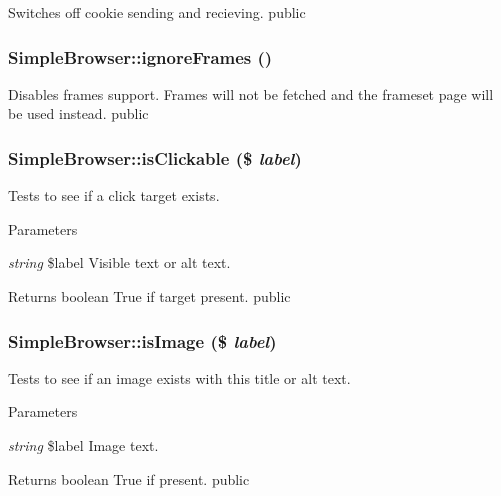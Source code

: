 \label{class_simple_browser_a116178a0d8efe15140f1fdfd53cd8d3c}
Switches off cookie sending and recieving.  public \hypertarget{class_simple_browser_aa2c35905e26fa5d489c9a9d7640080ee}{
\subsubsection[{ignoreFrames}]{\setlength{\rightskip}{0pt plus 5cm}SimpleBrowser::ignoreFrames ()}}
\label{class_simple_browser_aa2c35905e26fa5d489c9a9d7640080ee}
Disables frames support. Frames will not be fetched and the frameset page will be used instead.  public \hypertarget{class_simple_browser_adeb08f275213540419d48f9cad4aeda7}{
\subsubsection[{isClickable}]{\setlength{\rightskip}{0pt plus 5cm}SimpleBrowser::isClickable (\$ {\em label})}}
\label{class_simple_browser_adeb08f275213540419d48f9cad4aeda7}
Tests to see if a click target exists. 
\begin{DoxyParams}{Parameters}
\item[{\em string}]\$label Visible text or alt text. \end{DoxyParams}
\begin{DoxyReturn}{Returns}
boolean True if target present.  public 
\end{DoxyReturn}
\hypertarget{class_simple_browser_a38d002eebc7a6a822ee26e0fb9b6e1cd}{
\subsubsection[{isImage}]{\setlength{\rightskip}{0pt plus 5cm}SimpleBrowser::isImage (\$ {\em label})}}
\label{class_simple_browser_a38d002eebc7a6a822ee26e0fb9b6e1cd}
Tests to see if an image exists with this title or alt text. 
\begin{DoxyParams}{Parameters}
\item[{\em string}]\$label Image text. \end{DoxyParams}
\begin{DoxyReturn}{Returns}
boolean True if present.  public 
\end{DoxyReturn}
